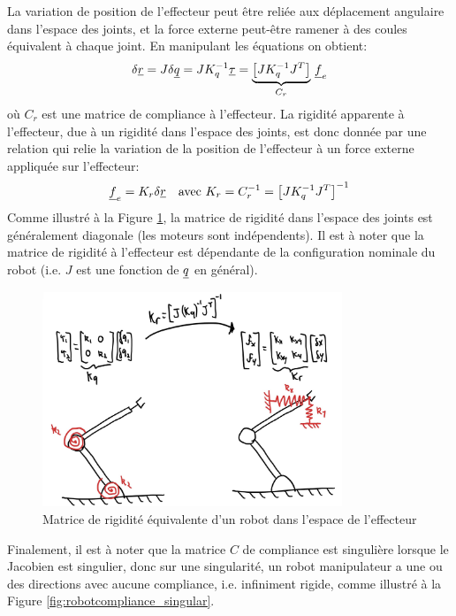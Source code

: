 La variation de position de l'effecteur peut être reliée aux déplacement angulaire dans l'espace des joints, et la force externe peut-être ramener à des coules équivalent à chaque joint. En manipulant les équations on obtient:
\begin{align}
\delta \underline{r} = J \delta \underline{q} = J K_q^{-1} \underline{\tau} = 
\underbrace{
\left[ J K_q^{-1} J^T \right]
}_{C_r} \,  \underline{f}_e
\end{align}
où $C_r$ est une matrice de compliance à l'effecteur. La rigidité apparente à l'effecteur, due à un rigidité dans l'espace des joints, est donc donnée par une relation qui relie la variation de la position de l'effecteur à un force externe appliquée sur l'effecteur:
\begin{align}
\underline{f}_e = K_r \delta \underline{r} \quad \text{avec } K_r = C_r^{-1} = \left[ J K_q^{-1} J^T \right]^{-1}
\end{align}
Comme illustré à la Figure \ref{fig:robotcompliance_effector}, la matrice de rigidité dans l'espace des joints est généralement diagonale (les moteurs sont indépendents). Il est à noter que la matrice de rigidité à l'effecteur est dépendante de la configuration nominale du robot (i.e. $J$ est une fonction de $\underline{q}$ en général).
\begin{figure}[htbp]
	\centering
		\includegraphics[width=0.80\textwidth]{fig/robotcompliance_effector.jpg}
	\caption{Matrice de rigidité équivalente d'un robot dans l'espace de l'effecteur}
	\label{fig:robotcompliance_effector}
\end{figure}
%
Finalement, il est à noter que la matrice $C$ de compliance est singulière lorsque le Jacobien est singulier, donc sur une singularité, un robot manipulateur a une ou des directions avec aucune compliance, i.e. infiniment rigide, comme illustré à la Figure \ref{fig:robotcompliance_singular}.
